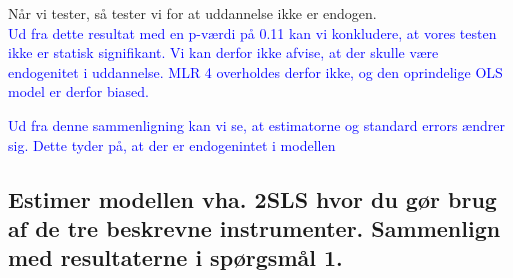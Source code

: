 \documentclass[
  10pt,
]{article}
\newenvironment{Shaded}{\begin{snugshade}}{\end{snugshade}}
\newcommand{\CommentTok}[1]{\textcolor[rgb]{0.56,0.35,0.01}{\textit{#1}}}
\newcommand{\DataTypeTok}[1]{\textcolor[rgb]{0.13,0.29,0.53}{#1}}
\newcommand{\DecValTok}[1]{\textcolor[rgb]{0.00,0.00,0.81}{#1}}
\newcommand{\KeywordTok}[1]{\textcolor[rgb]{0.13,0.29,0.53}{\textbf{#1}}}
\newcommand{\NormalTok}[1]{#1}
\begin{document}
Når vi tester, så tester vi for at uddannelse ikke er endogen.\\
\textcolor{blue}{Ud fra dette resultat med en p-værdi på 0.11 kan vi konkludere, at vores testen ikke er statisk signifikant. Vi kan derfor ikke afvise, at der skulle være endogenitet i uddannelse. MLR 4 overholdes derfor ikke, og den oprindelige OLS model er derfor biased.}

\begin{Shaded}
\end{Shaded}

\textcolor{blue}{Ud fra denne sammenligning kan vi se, at estimatorne og standard errors ændrer sig. Dette tyder på, at der er endogenintet i modellen}

\hypertarget{estimer-modellen-vha.-2sls-hvor-du-guxf8r-brug-af-de-tre-beskrevne-instrumenter.-sammenlign-med-resultaterne-i-spuxf8rgsmuxe5l-1.}{%
\subsection{Estimer modellen vha. 2SLS hvor du gør brug af de tre
beskrevne instrumenter. Sammenlign med resultaterne i spørgsmål
1.}\label{estimer-modellen-vha.-2sls-hvor-du-guxf8r-brug-af-de-tre-beskrevne-instrumenter.-sammenlign-med-resultaterne-i-spuxf8rgsmuxe5l-1.}}
\end{document}

